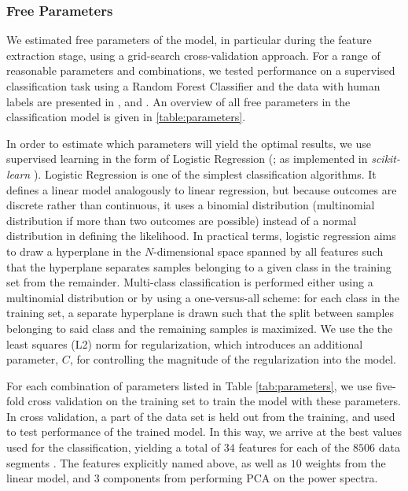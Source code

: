 \documentclass[12pt]{emulateapj}
\begin{document}
\subsubsection{Free Parameters}
\label{sec:freeparams}

We estimated free parameters of the model, in particular during the feature extraction stage, using a grid-search cross-validation approach. For a range of reasonable parameters and combinations, we tested performance on a supervised classification task using a Random Forest Classifier and the data with human labels are presented in \citet{belloni2000}, \citet{kleinwolt2002} and \citet{hannikainen2003}. An overview of all free parameters in the classification model is given in \ref{table:parameters}.

In order to estimate which parameters will yield the optimal results, we use supervised learning in the form of Logistic Regression (\citealt{cox1958}; as implemented in \textit{scikit-learn} \citealt{scikit-learn}). Logistic Regression is one of the simplest classification algorithms. It defines a linear model analogously to linear regression, but because outcomes are discrete rather than continuous, it uses a binomial distribution (multinomial distribution if more than two outcomes are possible) instead of a normal distribution in defining the likelihood. In practical terms, logistic regression aims to draw a hyperplane in the $N$-dimensional space spanned by all features such that the hyperplane separates samples belonging to a given class in the training set from the remainder. Multi-class classification is performed either using a multinomial distribution or by using a one-versus-all scheme: for each class in the training set, a separate hyperplane is drawn such that the split between samples belonging to said class and the remaining samples is maximized. We use the the least squares (L2) norm for regularization, which introduces an additional parameter, $C$, for controlling the magnitude of the regularization into the  model. 

For each combination of parameters listed in Table \ref{tab:parameters}, we use five-fold cross validation on the training set to train the model with these parameters. In cross validation, a part of the data set is held out from the training, and used to test performance of the trained model. In this way, we arrive at the best
values used for the classification, yielding a total of $34$ features for each of the $8506$ data segments . The features explicitly named above, as well as $10$ weights from the linear model, and $3$ components from performing PCA on the power spectra.
\end{document}
